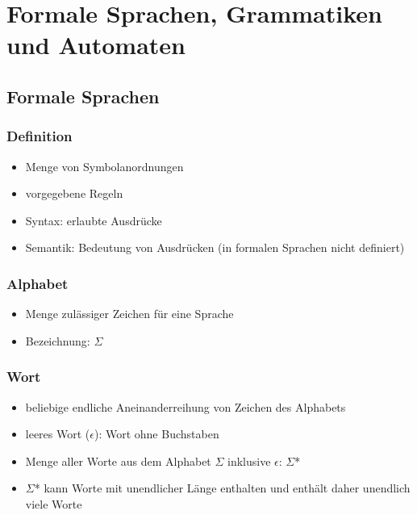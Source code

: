 \documentclass{article}
\begin{document}
	\section{Formale Sprachen, Grammatiken und Automaten}
	
	\subsection{Formale Sprachen}
	
	\subsubsection{Definition}
	
	\begin{itemize}
		\item Menge von Symbolanordnungen
		\item vorgegebene Regeln
		\item Syntax: erlaubte Ausdrücke
		\item Semantik: Bedeutung von Ausdrücken (in formalen Sprachen nicht definiert)
	\end{itemize}
	
	\subsubsection{Alphabet}
	
	\begin{itemize}
		\item Menge zulässiger Zeichen für eine Sprache
		\item Bezeichnung: $\Sigma$
	\end{itemize}
	
	\subsubsection{Wort}
	
	\begin{itemize}
		\item beliebige endliche Aneinanderreihung von Zeichen des Alphabets
		\item leeres Wort ($\epsilon$): Wort ohne Buchstaben
		\item Menge aller Worte aus dem Alphabet $\Sigma$ inklusive $\epsilon$: $\Sigma$*
		\item $\Sigma$* kann Worte mit unendlicher Länge enthalten und enthält daher unendlich viele Worte
	\end{itemize}
	
\end{document}
